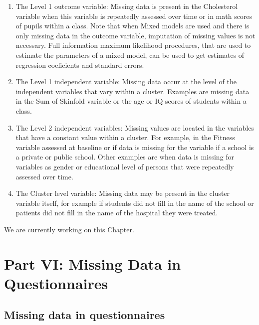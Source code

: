 \documentclass[]{book}
\begin{document}
\begin{enumerate}
\def\labelenumi{\arabic{enumi})}
\item
  The Level 1 outcome variable: Missing data is present in the
  Cholesterol variable when this variable is repeatedly assessed over
  time or in math scores of pupils within a class. Note that when Mixed
  models are used and there is only missing data in the outcome
  variable, imputation of missing values is not necessary. Full
  information maximum likelihood procedures, that are used to estimate
  the parameters of a mixed model, can be used to get estimates of
  regression coeficients and standard errors.
\item
  The Level 1 independent variable: Missing data occur at the level of
  the independent variables that vary within a cluster. Examples are
  missing data in the Sum of Skinfold variable or the age or IQ scores
  of students within a class.
\item
  The Level 2 independent variables: Missing values are located in the
  variables that have a constant value within a cluster. For example, in
  the Fitness variable assessed at baseline or if data is missing for
  the variable if a school is a private or public school. Other examples
  are when data is missing for variables as gender or educational level
  of persons that were repeatedly assessed over time.
\item
  The Cluster level variable: Missing data may be present in the cluster
  variable itself, for example if students did not fill in the name of
  the school or patients did not fill in the name of the hospital they
  were treated.
\end{enumerate}

We are currently working on this Chapter.

\part{Part VI: Missing Data in
Questionnaires}\label{part-part-vi-missing-data-in-questionnaires}

\chapter{Missing data in
questionnaires}\label{missing-data-in-questionnaires}
\end{document}
